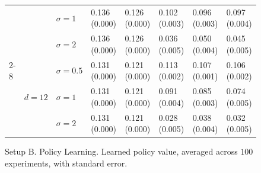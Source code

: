 \documentclass[11pt]{article} %
\theoremstyle{theorem}  %
\theoremstyle{plain}
\begin{document}
\begin{figure}[H]
\begin{tabular}{llllllll}
         &        & $\sigma=1$ &  0.136 (0.000) &  0.126 (0.000) &  0.102 (0.003) &  0.096 (0.003) &  0.097 (0.004) \\
         &        & $\sigma=2$ &  0.136 (0.000) &  0.126 (0.000) &  0.036 (0.005) &  0.050 (0.004) &  0.045 (0.005) \\
\cline{2-8}
         & \multirow{3}{*}{$d=12$} & $\sigma=0.5$ &  0.131 (0.000) &  0.121 (0.000) &  0.113 (0.002) &  0.107 (0.001) &  0.106 (0.002) \\
         &        & $\sigma=1$ &  0.131 (0.000) &  0.121 (0.000) &  0.091 (0.004) &  0.085 (0.003) &  0.074 (0.005) \\
         &        & $\sigma=2$ &  0.131 (0.000) &  0.121 (0.000) &  0.028 (0.005) &  0.038 (0.004) &  0.032 (0.005) \\
\bottomrule
\end{tabular}

\caption{Setup B. Policy Learning. Learned policy value, averaged across $100$ experiments, with standard error.}
\label{fig:setupB-policy}
\end{figure}
 
\end{document}
